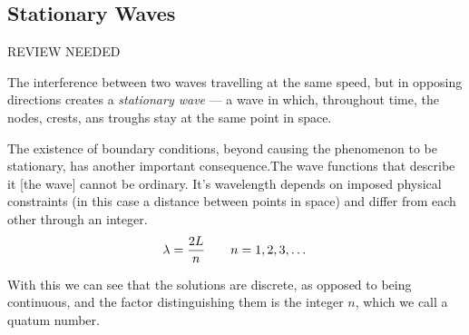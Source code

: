 \documentclass{article}[10pt]
\begin{document}
\subsection{Stationary Waves}
REVIEW NEEDED

The interference between two waves travelling at the same speed, but in opposing
directions creates a \emph{stationary wave} --- a wave in which, throughout
time, the nodes, crests, ans troughs stay at the same point in space.

The existence of boundary conditions, beyond causing the phenomenon to be
stationary, has another important consequence.The wave functions that describe
it [the wave] cannot be ordinary. It's wavelength depends on imposed physical
constraints (in this case a distance between points in space) and differ
from each other through an integer.
\[
    \lambda = \frac{2L}{n} \qquad n=1,2,3,\ldots \\
\]

With this we can see that the solutions are discrete, as opposed to being continuous, and the
 factor distinguishing them is the integer $n$, which we call a quatum number.
\begin{figure}[H]
\end{figure}
\end{document}
